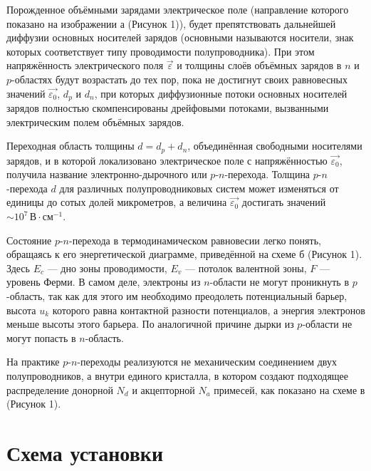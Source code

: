 \documentclass[a4paper,12pt]{article} %
\begin{document}
Порожденное объёмными зарядами электрическое поле (направление которого показано на изображении а (Рисунок 1)), будет препятствовать дальнейшей диффузии основных носителей зарядов (основными называются носители, знак которых соответствует типу проводимости полупроводника). При этом напряжённость электрического поля $\vec{\varepsilon}$ и толщины слоёв объёмных зарядов в $n$ и $p$-областях будут возрастать до тех пор, пока не достигнут своих равновесных значений $\vec{\varepsilon_0}$, $d_p$ и $d_n$, при которых диффузионные потоки основных носителей зарядов полностью скомпенсированы дрейфовыми потоками, вызванными электрическим полем объёмных зарядов. 

Переходная область толщины $d = d_p + d_n$, объединённая свободными носителями зарядов, и в которой локализовано электрическое поле с напряжённостью $\vec{\varepsilon_0}$, получила название электронно-дырочного или $p$-$n$-перехода. Толщина $p$-$n$-перехода $d$ для различных полупроводниковых систем может изменяться от единицы до сотых долей микрометров, а величина $\vec{\varepsilon_0}$ достигать значений $\sim 10^7 \, \text{В}\cdot\text{см}^{-1}$.

Состояние $p$-$n$-перехода в термодинамическом равновесии легко понять, обращаясь к его энергетической диаграмме, приведённой на схеме б (Рисунок 1). Здесь $E_c$ — дно зоны проводимости, $E_v$ — потолок валентной зоны, $F$ — уровень Ферми. В самом деле, электроны из $n$-области не могут проникнуть в $p$-область, так как для этого им необходимо преодолеть потенциальный барьер, высота $u_k$ которого равна контактной разности потенциалов, а энергия электронов меньше высоты этого барьера. По аналогичной причине дырки из $p$-области не могут попасть в $n$-область.

На практике $p$-$n$-переходы реализуются не механическим соединением двух полупроводников, а внутри единого кристалла, в котором создают подходящее распределение донорной $N_d$ и акцепторной $N_a$ примесей, как показано на схеме в (Рисунок 1).



\section{Схема установки}
\end{document}
